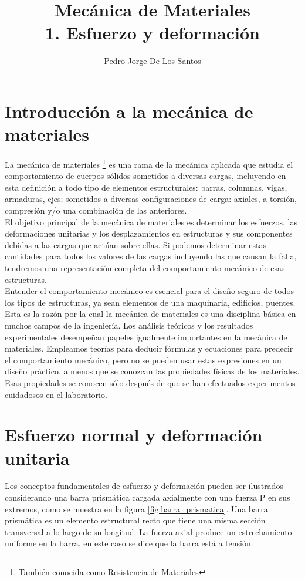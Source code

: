 \documentclass[12pt,letterpaper]{article}
\author{Pedro Jorge De Los Santos}
\title{
{\bf Mecánica de Materiales} \\
{\large 1. Esfuerzo y deformación}
}
\begin{document}
\maketitle
\tableofcontents

\section{Introducción a la mecánica de materiales}

La mecánica de materiales \footnote{También conocida como Resistencia de Materiales} es una rama de la 
mecánica aplicada que estudia el comportamiento de cuerpos sólidos sometidos a diversas cargas, incluyendo 
en esta definición a todo tipo de elementos estructurales: barras, columnas, vigas, armaduras, ejes; sometidos a 
diversas configuraciones de carga: axiales, a torsión, compresión y/o una combinación de las anteriores. \\

El objetivo principal de la mecánica de materiales es determinar los esfuerzos, las deformaciones 
unitarias y los desplazamientos en estructuras y sus componentes debidas a las cargas que actúan sobre 
ellas. Si podemos determinar estas cantidades para todos los valores de las cargas incluyendo las 
que causan la falla, tendremos una representación completa del comportamiento mecánico de esas estructuras. \\

Entender el comportamiento mecánico es esencial para el diseño seguro de todos los tipos de estructuras, ya sean 
elementos de una maquinaria, edificios, puentes. Esta es la razón por la cual la mecánica de materiales es una 
disciplina básica en muchos campos de la ingeniería. Los análisis teóricos y los resultados experimentales 
desempeñan papeles igualmente importantes en la mecánica de materiales. Empleamos teorías para deducir fórmulas 
y ecuaciones para predecir el comportamiento mecánico, pero no se pueden usar estas expresiones en un diseño 
práctico, a menos que se conozcan las propiedades físicas de los materiales. Esas propiedades se conocen 
sólo después de que se han efectuados experimentos cuidadosos en el laboratorio.


\section{Esfuerzo normal y deformación unitaria}

Los conceptos fundamentales de esfuerzo y deformación pueden ser ilustrados considerando una barra 
prismática cargada axialmente con una fuerza P en sus extremos, como se muestra en la figura 
\ref{fig:barra_prismatica}. Una barra prismática es un elemento estructural recto que tiene una 
misma sección transversal a lo largo de su longitud. La fuerza axial produce un estrechamiento uniforme 
en la barra, en este caso se dice que la barra está a tensión.
\end{document}
